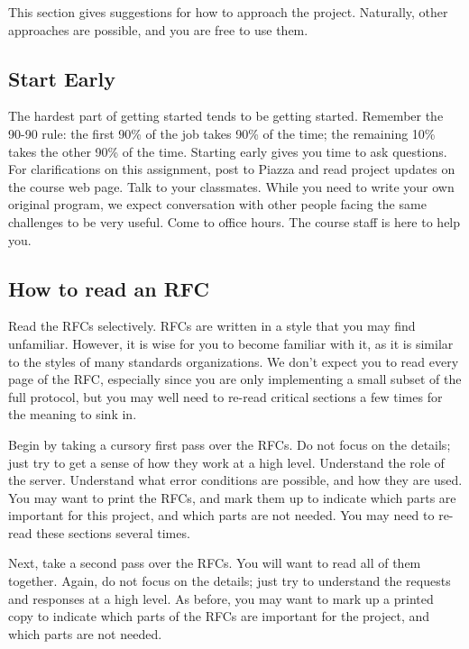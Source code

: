 This section gives suggestions for how to approach the project. Naturally, other
approaches are possible, and you are free to use them.

\subsection{Start Early}
	The hardest part of getting started tends to be
	  getting started. Remember the 90-90 rule: the first 90\% of the job takes
	  90\% of the time; the remaining 10\% takes the other 90\% of the time.
	  Starting early gives you time to ask questions. For clarifications on
	  this assignment, post to Piazza and read project updates on the course
	  web page.  Talk to your classmates. While you need to write your own
	  original program, we expect conversation with other people facing the
	  same challenges to be very useful. Come to office hours. The course staff
	  is here to help you.

\subsection{How to read an RFC}
	 
   Read the RFCs selectively. RFCs are written in a style that you may
      find unfamiliar. However, it is wise for you to become familiar with it,
      as it is similar to the styles of many standards organizations. We don't
      expect you to read every page of the RFC, especially since you are only
      implementing a small subset of the full protocol, but you may well need to
      re-read critical sections a few times for the meaning to sink in.

	 Begin by taking a cursory first pass over the RFCs. Do not focus on
      the details; just try to get a sense of how they work at a high
      level. Understand the role of the server. Understand what error conditions
      are possible, and how they are used. You may want to print the RFCs, and
      mark them up to indicate which parts are important for this project, and
      which parts are not needed. You may need to re-read these sections several
      times.

	 Next, take a second pass over the RFCs. You will want to read all of
      them together.  Again, do not focus on the details; just try to understand
      the requests and responses at a high level. As before, you may want to
      mark up a printed copy to indicate which parts of the RFCs are important
      for the project, and which parts are not needed.

